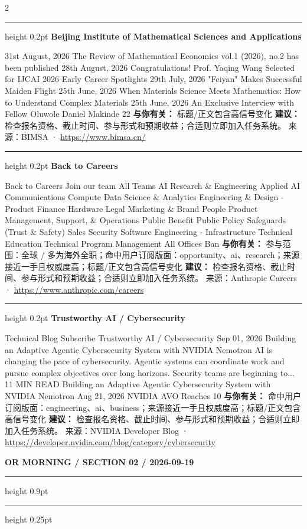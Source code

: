 \documentclass[10.5pt]{ctexart}
\begin{document}
\begin{multicols}{2}
\vspace{2mm}
\hrule height 0.2pt
\vspace{2mm}
{\large\bfseries Beijing Institute of Mathematical Sciences and Applications}\par
31st August, 2026 The Review of Mathematical Economics vol.1 (2026), no.2 has been published 28th August, 2026 Congratulations! Prof. Yaqing Wang Selected for IJCAI 2026 Early Career Spotlights 29th July, 2026 "Feiyan" Makes Successful Maiden Flight 25th June, 2026 When Materials Science Meets Mathematics: How to Understand Complex Materials 25th June, 2026 An Exclusive Interview with Fellow Oluwole Daniel Makinde 22
\textbf{与你有关：} 标题/正文包含高信号变化
\textbf{建议：} 检查报名资格、截止时间、参与形式和预期收益；合适则立即加入任务系统。
{\footnotesize\color{ormuted} 来源：BIMSA · \url{https://www.bimsa.cn/}}
\vspace{2mm}
\hrule height 0.2pt
\vspace{2mm}
{\large\bfseries Back to Careers}\par
Back to Careers Join our team All Teams AI Research \& Engineering Applied AI Communications Compute Data Science \& Analytics Engineering \& Design - Product Finance Hardware Legal Marketing \& Brand People Product Management, Support, \& Operations Public Benefit Public Policy Safeguards (Trust \& Safety) Sales Security Software Engineering - Infrastructure Technical Education Technical Program Management All Offices Ban
\textbf{与你有关：} 参与范围：全球 / 多为海外全职；命中用户订阅版面：opportunity、ai、research；来源接近一手且权威度高；标题/正文包含高信号变化
\textbf{建议：} 检查报名资格、截止时间、参与形式和预期收益；合适则立即加入任务系统。
{\footnotesize\color{ormuted} 来源：Anthropic Careers · \url{https://www.anthropic.com/careers}}
\vspace{2mm}
\hrule height 0.2pt
\vspace{2mm}
{\large\bfseries Trustworthy AI / Cybersecurity}\par
Technical Blog Subscribe Trustworthy AI / Cybersecurity Sep 01, 2026 Building an Adaptive Agentic Cybersecurity System with NVIDIA Nemotron AI is changing the pace of cybersecurity. Agentic systems can coordinate work and pursue complex objectives over long horizons. Security teams are beginning to... 11 MIN READ Building an Adaptive Agentic Cybersecurity System with NVIDIA Nemotron Aug 21, 2026 NVIDIA AVO Reaches 10
\textbf{与你有关：} 命中用户订阅版面：engineering、ai、business；来源接近一手且权威度高；标题/正文包含高信号变化
\textbf{建议：} 检查报名资格、截止时间、参与形式和预期收益；合适则立即加入任务系统。
{\footnotesize\color{ormuted} 来源：NVIDIA Developer Blog · \url{https://developer.nvidia.com/blog/category/cybersecurity}}
\end{multicols}
\newpage
{\small\bfseries OR MORNING / SECTION 02 / 2026-09-19}
\vspace{2mm}
\hrule height 0.9pt
\vspace{1.5mm}
\hrule height 0.25pt
\vspace{4mm}
\end{document}
